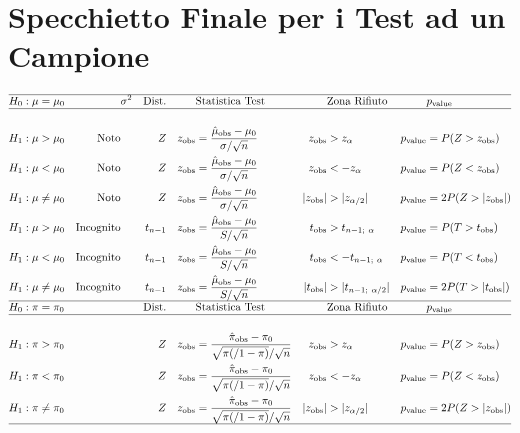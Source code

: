 \documentclass[
  11pt,
]{book}
\theoremstyle{mytheoremstyle}
\theoremstyle{mydefstyle}
\begin{document}
\clearpage

\section{Specchietto Finale per i Test ad un Campione}\label{specchietto-finale-per-i-test-ad-un-campione}

\begin{info2}

\small

\begin{align*}
\hline 
H_0:\mu&=\mu_0 &&\text{$\sigma^2$} &\text{Dist.}   & && \text{Statistica Test} &&   \text{Zona Rifiuto} &&p_\text{value}\\
\hline\\
H_1:\mu&>\mu_0 & \text{Noto} &&  Z && z_\text{obs}&=\frac{\hat \mu_\text{obs}-\mu_0}{\sigma/\sqrt{n}} & z_\text{obs}&>z_\alpha & p_\text{value}&= P(Z>z_\text{obs})\\
H_1:\mu&<\mu_0 & \text{Noto} &&  Z && z_\text{obs}&=\frac{\hat \mu_\text{obs}-\mu_0}{\sigma/\sqrt{n}} & z_\text{obs}&<-z_\alpha& p_\text{value}&= P(Z<z_\text{obs})\\
H_1:\mu&\ne\mu_0 & \text{Noto} &&  Z && z_\text{obs}&=\frac{\hat \mu_\text{obs}-\mu_0}{\sigma/\sqrt{n}} & |z_\text{obs}|&>|z_{\alpha/2}| & p_\text{value}&= 2P(Z>|z_\text{obs}|)\\
H_1:\mu&>\mu_0 & \text{Incognito} &&  t_{n-1} && z_\text{obs}&=\frac{\hat \mu_\text{obs}-\mu_0}{S/\sqrt{n}} & t_\text{obs}&>t_{n-1;~\alpha}& p_\text{value}&= P(T>t_\text{obs})\\
H_1:\mu&<\mu_0 & \text{Incognito} &&  t_{n-1} && z_\text{obs}&=\frac{\hat \mu_\text{obs}-\mu_0}{S/\sqrt{n}} & t_\text{obs}&<-t_{n-1;~\alpha}& p_\text{value}&= P(T<t_\text{obs})\\
H_1:\mu&\ne\mu_0 & \text{Incognito} &&  t_{n-1} && z_\text{obs}&=\frac{\hat \mu_\text{obs}-\mu_0}{S/\sqrt{n}} & |t_\text{obs}|&>|t_{n-1;~\alpha/2}|& p_\text{value}&= 2P(T>|t_\text{obs}|)\\
\hline
H_0:\pi&=\pi_0 && &\text{Dist.}   && &\text{Statistica Test} &&   \text{Zona Rifiuto} &&p_\text{value}\\
\hline\\
H_1:\pi&>\pi_0 &  &&  Z && z_\text{obs}&=\frac{\hat \pi_\text{obs}-\pi_0}{\sqrt{\pi(/1-\pi)}/\sqrt{n}} & z_\text{obs}&>z_\alpha& p_\text{value}&= P(Z>z_\text{obs})\\
H_1:\pi&<\pi_0 &  &&  Z && z_\text{obs}&=\frac{\hat \pi_\text{obs}-\pi_0}{\sqrt{\pi(/1-\pi)}/\sqrt{n}} & z_\text{obs}&<-z_\alpha& p_\text{value}&= P(Z<z_\text{obs})\\
H_1:\pi&\ne\pi_0 &  &&  Z && z_\text{obs}&=\frac{\hat \pi_\text{obs}-\pi_0}{\sqrt{\pi(/1-\pi)}/\sqrt{n}} & |z_\text{obs}|&>|z_{\alpha/2}| & p_\text{value}&= 2P(Z>|z_\text{obs}|)\\
\hline
\end{align*}

\end{info2}
\end{document}
